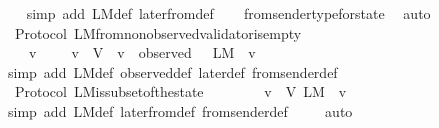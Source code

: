 \begin{isabellebody}
%
\isadelimproof
\ \ %
\endisadelimproof
%
\isatagproof
{}\isamarkupfalse%
\ {\isacharparenleft}simp\ add{\isacharcolon}\ L{\isacharunderscore}M{\isacharunderscore}def\ later{\isacharunderscore}from{\isacharunderscore}def{\isacharparenright}\isanewline
\ \ \isamarkupfalse%
\ from{\isacharunderscore}sender{\isacharunderscore}type{\isacharunderscore}for{\isacharunderscore}state\ \isamarkupfalse%
\ auto%
\endisatagproof
{\isafoldproof}%
%
\isadelimproof
\isanewline
%
\endisadelimproof
\isanewline
{}\isamarkupfalse%
\ {\isacharparenleft}\ Protocol{\isacharparenright}\ L{\isacharunderscore}M{\isacharunderscore}from{\isacharunderscore}non{\isacharunderscore}observed{\isacharunderscore}validator{\isacharunderscore}is{\isacharunderscore}empty\ {\isacharcolon}\isanewline
\ \ {\isachardoublequoteopen}{\isasymforall}\ {\isasymsigma}\ v{\isachardot}\ {\isasymsigma}\ {\isasymin}\ {\isasymSigma}\ {\isasymand}\ v\ {\isasymin}\ V\ {\isasymand}\ v\ {\isasymnotin}\ observed\ {\isasymsigma}\ {\isasymlongrightarrow}\ L{\isacharunderscore}M\ {\isasymsigma}\ v\ {\isacharequal}\ {\isasymemptyset}{\isachardoublequoteclose}\isanewline
%
\isadelimproof
\ \ %
\endisadelimproof
%
\isatagproof
{}\isamarkupfalse%
\ {\isacharparenleft}simp\ add{\isacharcolon}\ L{\isacharunderscore}M{\isacharunderscore}def\ observed{\isacharunderscore}def\ later{\isacharunderscore}def\ from{\isacharunderscore}sender{\isacharunderscore}def{\isacharparenright}%
\endisatagproof
{\isafoldproof}%
%
\isadelimproof
\isanewline
%
\endisadelimproof
\isanewline
{}\isamarkupfalse%
\ {\isacharparenleft}\ Protocol{\isacharparenright}\ L{\isacharunderscore}M{\isacharunderscore}is{\isacharunderscore}subset{\isacharunderscore}of{\isacharunderscore}the{\isacharunderscore}state\ {\isacharcolon}\isanewline
\ \ {\isachardoublequoteopen}{\isasymforall}\ {\isasymsigma}\ {\isasymin}\ {\isasymSigma}{\isachardot}\ {\isasymforall}\ v\ {\isasymin}\ V{\isachardot}\ L{\isacharunderscore}M\ {\isasymsigma}\ v\ {\isasymsubseteq}\ {\isasymsigma}{\isachardoublequoteclose}\isanewline
%
\isadelimproof
\ \ %
\endisadelimproof
%
\isatagproof
{}\isamarkupfalse%
\ {\isacharparenleft}simp\ add{\isacharcolon}\ L{\isacharunderscore}M{\isacharunderscore}def\ later{\isacharunderscore}from{\isacharunderscore}def\ from{\isacharunderscore}sender{\isacharunderscore}def{\isacharparenright}\ \isanewline
\ \ \isamarkupfalse%
\ auto%
\endisatagproof
{\isafoldproof}%
%
\isadelimproof
\isanewline
%
\endisadelimproof

\end{isabellebody}
